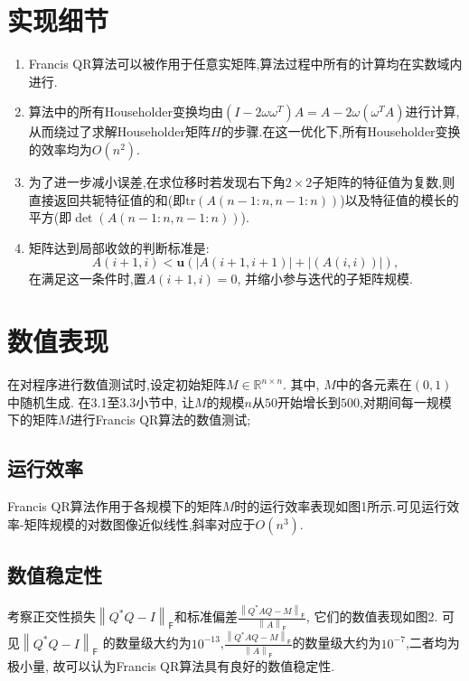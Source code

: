 \documentclass[12pt, a4paper, oneside]{ctexart}
\begin{document}
\section{实现细节}
    \begin{enumerate}
        \item Francis QR算法可以被作用于任意实矩阵,算法过程中所有的计算均在实数域内进行.
        \item 算法中的所有Householder变换均由$(I-2\omega \omega^T)A = A - 2\omega(\omega^T A)$进行计算,从而绕过了求解Householder矩阵$H$的步骤.在这一优化下,所有Householder变换的效率均为$O(n^2)$.
        \item 为了进一步减小误差,在求位移时若发现右下角$2 \times 2$子矩阵的特征值为复数,则直接返回共轭特征值的和(即$\text{tr}(A(n-1:n, n-1:n))$)以及特征值的模长的平方(即$\det(A(n-1:n, n-1:n))$).
        \item 矩阵达到局部收敛的判断标准是:$$A(i+1,i) < \textbf{u} (|A(i+1, i+1)| + |(A(i, i))|),$$在满足这一条件时,置$A(i+1, i) = 0$, 并缩小参与迭代的子矩阵规模.
    \end{enumerate}

\section{数值表现}
    在对程序进行数值测试时,设定初始矩阵$M \in \mathbb{R}^{n \times n}$. 其中, $M$中的各元素在$(0,1)$中随机生成.
    在3.1至3.3小节中, 让$M$的规模$n$从$50$开始增长到$500$,对期间每一规模下的矩阵$M$进行Francis QR算法的数值测试;

\subsection{运行效率}
    Francis QR算法作用于各规模下的矩阵$M$时的运行效率表现如图1所示.可见运行效率-矩阵规模的对数图像近似线性,斜率对应于$O(n^3)$.

\subsection{数值稳定性}
    考察正交性损失${\left\lVert{Q^*Q - I}\right\rVert}_{\mathsf{F}}$和标准偏差$\frac{{\left\lVert{Q^* A Q - M}\right\rVert}_{\mathsf{F}}}{{\left\lVert{A}\right\rVert}_{\mathsf{F}}}$, 它们的数值表现如图2. 
    可见${\left\lVert{Q^*Q - I}\right\rVert}_{\mathsf{F}}$ 的数量级大约为$10^{-13}$,$\frac{{\left\lVert{Q^* A Q - M}\right\rVert}_{\mathsf{F}}}{{\left\lVert{A}\right\rVert}_{\mathsf{F}}}$的数量级大约为$10^{-7}$,二者均为极小量, 故可以认为Francis QR算法具有良好的数值稳定性.
\end{document}
